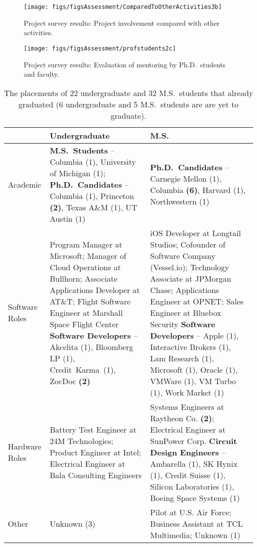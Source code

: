 \documentclass[journal,twopages]{IEEEtran}
\begin{document}
\begin{figure}
\centering
\texttt{[image: figs/figsAssessment/ComparedToOtherActivities3b]}\caption{\label{fig:ComparedToOtherActivities} Project survey results: Project involvement compared with other activities.}
\end{figure}

\begin{figure}
\centering
\texttt{[image: figs/figsAssessment/profstudents2c]}\caption{\label{fig:compareProfStudent} Project survey results: Evaluation of mentoring by Ph.D.\ students and faculty.}
\end{figure}
\newcommand \indsize {-2.5em}

\begin{table*}[t]
\center
\scriptsize
\begin{tabular}{|p{}||p{}|p{}|}
\hline & Undergraduate & M.S.\ \\
\hline
\hline Academic
 &
\textbf{M.S.\ Students} --  Columbia (1), University of Michigan (1);  
\textbf{Ph.D.\ Candidates} --  Columbia (1), Princeton  \textbf{(2)}, Texas A\&M (1), UT Austin (1)
 &
\textbf{Ph.D.\ Candidates} --
 Carnegie Mellon (1), Columbia \textbf{(6)}, Harvard (1), Northwestern (1)
  \\
\hline Software Roles
 &
Program Manager at Microsoft; Manager of Cloud Operations at Bullhorn; Associate Applications Developer at AT\&T; Flight Software Engineer at Marshall Space Flight Center\newline
\textbf{Software Developers} -- Akcelita (1), Bloomberg LP (1), Credit~Karma~(1), ZocDoc \textbf{(2)}
 &
iOS Developer at Longtail Studios; Cofounder of Software Company (Vessel.io); Technology Associate at JPMorgan Chase; Applications Engineer at OPNET; Sales Engineer at Bluebox Security\newline
\textbf{Software Developers} --  Apple (1), Interactive Brokers (1), Lam Research (1), Microsoft (1), Oracle (1), VMWare (1), VM Turbo (1), Work Market (1)
  \\
\hline Hardware Roles &
Battery Test Engineer at 24M Technologies;
Product Engineer at Intel;
Electrical Engineer at Bala Consulting Engineers
 &
Systems Engineers at Raytheon Co. \textbf{(2)}; Electrical Engineer at SunPower Corp.\newline
\textbf{Circuit Design Engineers} -- Ambarella (1), SK Hynix (1), Credit Suisse (1), Silicon Laboratories (1), Boeing Space Systems (1) 
 \\
\hline Other &
Unknown (3)
 &
Pilot at U.S. Air Force; 
Business Assistant at TCL Multimedia;
Unknown (1)
 \\
\hline
\end{tabular}
\caption{\label{tab:plac}The placements of 22 undergraduate and 32 M.S.\ students that already graduated (6 undergraduate and 5 M.S.\ students are are yet to graduate).}
\end{table*}
\end{document}
